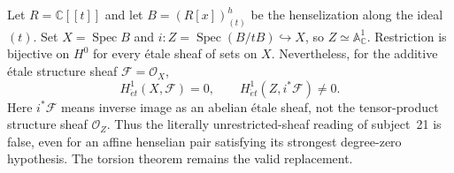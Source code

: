 \begin{proposition}\label{B:nontorsion-rigidity}
Let $R=\mathbb C[[t]]$ and let $B=(R[x])^h_{(t)}$ be the henselization along the ideal $(t)$. Set $X=\operatorname{Spec}B$ and $i:Z=\operatorname{Spec}(B/tB)\hookrightarrow X$, so $Z\simeq\mathbb A^1_{\mathbb C}$. Restriction is bijective on $H^0$ for every \'etale sheaf of sets on $X$. Nevertheless, for the additive \'etale structure sheaf $\mathcal F=\mathcal O_X$,
\[
 H^1_{\acute et}(X,\mathcal F)=0,
 \qquad H^1_{\acute et}(Z,i^*\mathcal F)\ne0.
\]
Here $i^*\mathcal F$ means inverse image as an abelian \'etale sheaf, not the tensor-product structure sheaf $\mathcal O_Z$. Thus the literally unrestricted-sheaf reading of subject~21 is false, even for an affine henselian pair satisfying its strongest degree-zero hypothesis. The torsion theorem remains the valid replacement.
\end{proposition}
